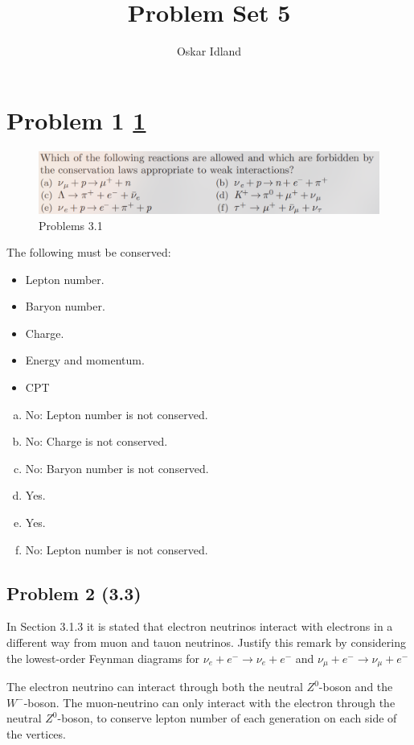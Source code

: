 \documentclass{article}
\author{Oskar Idland}
\title{Problem Set 5}
\date{}
\begin{document}
\maketitle
\newpage
\section*{Problem 1 \cref{fig: problems3.1}}
\begin{figure}[h!]
\centering
\includegraphics[width = .9\textwidth]{problems3.1.png}
\caption{Problems 3.1}
\label{fig: problems3.1}
\end{figure}

The following must be conserved:
\begin{itemize}
    \item Lepton number. 
    \item Baryon number. 
    \item Charge. 
    \item Energy and momentum. 
    \item CPT
\end{itemize}
\begin{enumerate}[a)]
    \item No: Lepton number is not conserved. 
    \item No: Charge is not conserved. 
    \item No: Baryon number is not conserved. 
    \item Yes. 
    \item Yes. 
    \item No: Lepton number is not conserved. 
\end{enumerate}

\subsection*{Problem 2 (3.3)}
\begin{mdframed}
  In Section 3.1.3 it is stated that electron neutrinos interact with electrons in a different way from muon and tauon neutrinos. Justify this remark by considering the lowest-order Feynman diagrams for $ν_e + e^{-} → ν_e + e^{-}$ and $ν_{μ} + e^{-} → ν_{μ} + e^{-}$
\end{mdframed}
The electron neutrino can interact through both the neutral $Z^{0}$-boson and the $W^{-}$-boson. The muon-neutrino can only interact with the electron through the neutral $Z^{0}$-boson, to conserve lepton number of each generation on each side of the vertices. 
\end{document}
